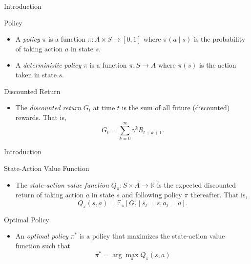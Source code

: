 \documentclass{beamer}
\begin{document}

\begin{frame}{Introduction}

\begin{block}{Policy \cite{puterman2014markov}}
\begin{itemize}
\item A \textit{policy} $\pi$ is a function $\pi: A \times S \to [0, 1]$ where $\pi(a \mid s)$ is the probability of taking action $a$ in state $s$.
\item A \textit{deterministic policy} $\pi$ is a function $\pi: S \to A$ where $\pi(s)$ is the action taken in state $s$.
\end{itemize}
\end{block}

\begin{block}{Discounted Return \cite{puterman2014markov}}
\begin{itemize}
\item The \textit{discounted return} $G_t$ at time $t$ is the sum of all future (discounted) rewards. That is, 
$$G_{t} = \sum_{k=0}^{\infty} \gamma^{k} R_{t+k+1}.$$
\end{itemize}
\end{block}

\end{frame}


\begin{frame}{Introduction}

\begin{block}{State-Action Value Function \cite{puterman2014markov}}
\begin{itemize}
\item The \textit{state-action value function} $Q_{\pi}: S \times A \to \mathbb{R}$ is the expected discounted return of taking action $a$ in state $s$ and following policy $\pi$ thereafter. That is,
$$Q_{\pi}(s, a) = \mathbb{E}_{\pi} \left[ G_{t} \mid s_{t} = s, a_{t} = a \right].$$
\end{itemize}
\end{block}

\begin{block}{Optimal Policy \cite{puterman2014markov}}
\begin{itemize}
\item An \textit{optimal policy} $\pi^{*}$ is a policy that maximizes the state-action value function such that 
$$\pi^{*} = \arg \max_{\pi} Q_{\pi}(s, a)$$
\end{itemize}
\end{block}

\end{frame}
\end{document}
